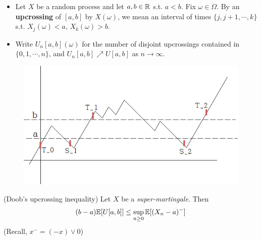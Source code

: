 \documentclass[10pt,a4paper]{report}
\begin{document}
\begin{itemize}
\item Let $X$ be a random process and let $a,b\in \mathbb{R}$ s.t. $a<b$. Fix $\omega \in \Omega$. By an \textbf{upcrossing} of $[a,b]$ by $X(\omega)$, we mean an interval of times $\{j,j+1, \cdots, k\}$ s.t. $X_j(\omega) <a$, $X_k(\omega) >b$.

\item Write $U_n[a,b](\omega)$ for the number of disjoint upcrossings contained in $\{0,1,\cdots,n\}$, and $U_n[a,b] \nearrow U[a,b]$ as $n\rightarrow \infty$.
\end{itemize}
\s


\begin{figure}[h]
	\centering
		\includegraphics[scale=0.5]{upcrossing}
	\centering
\end{figure}


(Doob's upcrossing inequality) Let $X$ be a \emph{super-martingale}. Then
\begin{align*}
(b-a) \mathbb{E}[U[a,b]] \leq \sup_{n\geq 0} \mathbb{E}[(X_n-a)^{-}]
\end{align*}
(Recall, $x^- = (-x) \vee 0$)
\s
\end{document}
